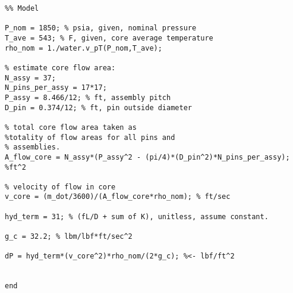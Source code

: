 \begin{fullwidth}
\begin{lstlisting}
%% Model

P_nom = 1850; % psia, given, nominal pressure
T_ave = 543; % F, given, core average temperature
rho_nom = 1./water.v_pT(P_nom,T_ave);

% estimate core flow area:
N_assy = 37;
N_pins_per_assy = 17*17; 
P_assy = 8.466/12; % ft, assembly pitch
D_pin = 0.374/12; % ft, pin outside diameter 

% total core flow area taken as 
%totality of flow areas for all pins and
% assemblies.
A_flow_core = N_assy*(P_assy^2 - (pi/4)*(D_pin^2)*N_pins_per_assy); %ft^2

% velocity of flow in core
v_core = (m_dot/3600)/(A_flow_core*rho_nom); % ft/sec

hyd_term = 31; % (fL/D + sum of K), unitless, assume constant.

g_c = 32.2; % lbm/lbf*ft/sec^2

dP = hyd_term*(v_core^2)*rho_nom/(2*g_c); %<- lbf/ft^2


end
\end{lstlisting}
\end{fullwidth}
